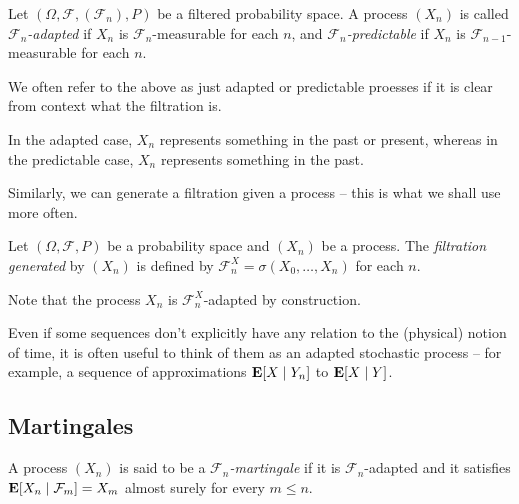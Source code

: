		\begin{definition}
			Let $(\Omega,\mathcal{F},(\mathcal{F}_n),P)$ be a filtered probability space. A process $(X_n)$ is called \textit{$\mathcal{F}_n$-adapted} if $X_n$ is $\mathcal{F}_n$-measurable for each $n$, and \textit{$\mathcal{F}_n$-predictable} if $X_n$ is $\mathcal{F}_{n-1}$-measurable for each $n$.
		\end{definition}

		We often refer to the above as just adapted or predictable proesses if it is clear from context what the filtration is.

		In the adapted case, $X_n$ represents something in the past or present, whereas in the predictable case, $X_n$ represents something in the past.

		Similarly, we can generate a filtration given a process -- this is what we shall use more often.

		\begin{definition}
			Let $(\Omega,\mathcal{F},P)$ be a probability space and $(X_n)$ be a process. The \textit{filtration generated} by $(X_n)$ is defined by $\mathcal{F}_n^X=\sigma(X_0,\ldots,X_n)$ for each $n$.
		\end{definition}
		Note that the process $X_n$ is $\mathcal{F}_n^X$-adapted by construction.

		Even if some sequences don't explicitly have any relation to the (physical) notion of time, it is often useful to think of them as an adapted stochastic process -- for example, a sequence of approximations $\textbf{E}[X\mid Y_n]$ to $\textbf{E}[X\mid Y]$.

	\subsection{Martingales}

		\begin{fdef}
			A process $(X_n)$ is said to be a \textit{$\mathcal{F}_n$-martingale} if it is $\mathcal{F}_n$-adapted and it satisfies $\textbf{E}[X_n\mid\mathcal{F}_m] = X_m$ almost surely for every $m\leq n$.
		\end{fdef}

